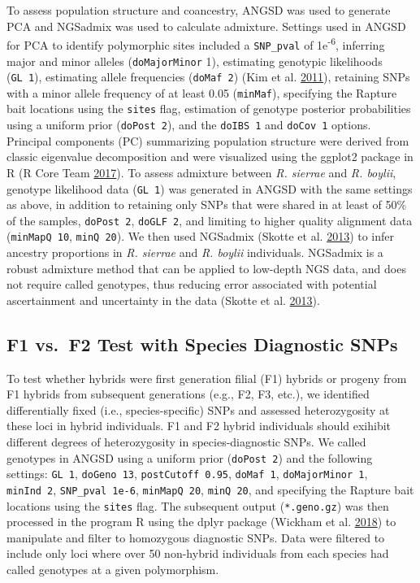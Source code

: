 \documentclass[proquest,12pt,final]{ucthesis-CA2012} %
\begin{document}
\begin{ucmainmatter}
To assess population structure and coancestry, ANGSD was used to
generate PCA and NGSadmix was used to calculate admixture. Settings used
in ANGSD for PCA to identify polymorphic sites included a
\texttt{SNP\_pval} of 1e\textsuperscript{-6}, inferring major and minor
alleles (\texttt{doMajorMinor} 1), estimating genotypic likelihoods
(\texttt{GL\ 1}), estimating allele frequencies (\texttt{doMaf\ 2}) (Kim
et al. \protect\hyperlink{ref-kim_estimation_2011}{2011}), retaining
SNPs with a minor allele frequency of at least 0.05 (\texttt{minMaf}),
specifying the Rapture bait locations using the \texttt{sites} flag,
estimation of genotype posterior probabilities using a uniform prior
(\texttt{doPost\ 2}), and the \texttt{doIBS\ 1} and \texttt{doCov\ 1}
options. Principal components (PC) summarizing population structure were
derived from classic eigenvalue decomposition and were visualized using
the ggplot2 package in R (R Core Team
\protect\hyperlink{ref-r_core_team_r_2017}{2017}). To assess admixture
between \emph{R. sierrae} and \emph{R. boylii}, genotype likelihood data
(\texttt{GL\ 1}) was generated in ANGSD with the same settings as above,
in addition to retaining only SNPs that were shared in at least of 50\%
of the samples, \texttt{doPost\ 2}, \texttt{doGLF\ 2}, and limiting to
higher quality alignment data (\texttt{minMapQ\ 10}, \texttt{minQ\ 20}).
We then used NGSadmix (Skotte et al.
\protect\hyperlink{ref-skotte_estimating_2013}{2013}) to infer ancestry
proportions in \emph{R. sierrae} and \emph{R. boylii} individuals.
NGSadmix is a robust admixture method that can be applied to low-depth
NGS data, and does not require called genotypes, thus reducing error
associated with potential ascertainment and uncertainty in the data
(Skotte et al. \protect\hyperlink{ref-skotte_estimating_2013}{2013}).

\hypertarget{f1vsf2}{%
\subsection{F1 vs.~F2 Test with Species Diagnostic SNPs}\label{f1vsf2}}

To test whether hybrids were first generation filial (F1) hybrids or
progeny from F1 hybrids from subsequent generations (e.g., F2, F3,
etc.), we identified differentially fixed (i.e., species-specific) SNPs
and assessed heterozygosity at these loci in hybrid individuals. F1 and
F2 hybrid individuals should exihibit different degrees of
heterozygosity in species-diagnostic SNPs. We called genotypes in ANGSD
using a uniform prior (\texttt{doPost\ 2}) and the following settings:
\texttt{GL\ 1}, \texttt{doGeno\ 13}, \texttt{postCutoff\ 0.95},
\texttt{doMaf\ 1}, \texttt{doMajorMinor\ 1}, \texttt{minInd\ 2},
\texttt{SNP\_pval\ 1e-6}, \texttt{minMapQ\ 20}, \texttt{minQ\ 20}, and
specifying the Rapture bait locations using the \texttt{sites} flag. The
subsequent output (\texttt{*.geno.gz}) was then processed in the program
R using the dplyr package (Wickham et al.
\protect\hyperlink{ref-wickham_dplyr_2018}{2018}) to manipulate and
filter to homozygous diagnostic SNPs. Data were filtered to include only
loci where over 50 non-hybrid individuals from each species had called
genotypes at a given polymorphism.


\end{ucmainmatter}
\end{document}
